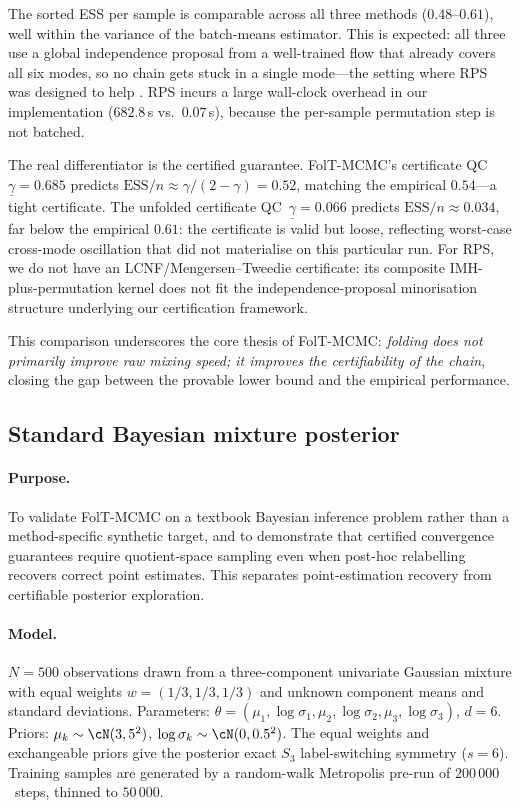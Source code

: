 The sorted ESS per sample is comparable across all three methods
($0.48$--$0.61$), well within the variance of the batch-means
estimator.  This is expected: all three use a global independence
proposal from a well-trained flow that already covers all six
modes, so no chain gets stuck in a single mode---the setting where
RPS was designed to help \citep{FruhwirthSchnatter2001}.
RPS incurs a large wall-clock overhead in our implementation
($682.8$\,s vs.\ $0.07$\,s), because the per-sample permutation
step is not batched.

The real differentiator is the certified guarantee.
FolT-MCMC's certificate QC~$\underline{\gamma} = 0.685$ predicts
$\mathrm{ESS}/n \approx \gamma/(2-\gamma) = 0.52$, matching the
empirical $0.54$---a tight certificate.
The unfolded certificate QC~$\underline{\gamma} = 0.066$ predicts
$\mathrm{ESS}/n \approx 0.034$, far below the empirical $0.61$:
the certificate is valid but loose, reflecting worst-case
cross-mode oscillation that did not materialise on this particular
run.
For RPS, we do not have an LCNF/Mengersen--Tweedie certificate:
its composite IMH-plus-permutation kernel does not fit the
independence-proposal minorisation structure underlying our
certification framework.

This comparison underscores the core thesis of FolT-MCMC:
\emph{folding does not primarily improve raw mixing speed; it
improves the certifiability of the chain}, closing the gap between
the provable lower bound and the empirical performance.


\subsection{Standard Bayesian mixture posterior}
\label{sec:exp_bayesian_mixture}

\paragraph{Purpose.}
To validate FolT-MCMC on a textbook Bayesian inference problem
rather than a method-specific synthetic target, and to demonstrate
that certified convergence guarantees require quotient-space
sampling even when post-hoc relabelling recovers correct point
estimates.  This separates point-estimation recovery from
certifiable posterior exploration.

\paragraph{Model.}
$N = 500$ observations drawn from a three-component univariate
Gaussian mixture with equal weights $w = (1/3, 1/3, 1/3)$ and
unknown component means and standard deviations.
Parameters: $\theta = (\mu_1, \log\sigma_1, \mu_2, \log\sigma_2,
\mu_3, \log\sigma_3)$, $d = 6$.
Priors: $\mu_k \sim \cN(3, 5^2)$,
$\log\sigma_k \sim \cN(0, 0.5^2)$.
The equal weights and exchangeable priors give the posterior
exact $S_3$ label-switching symmetry ($s = 6$).
Training samples are generated by a random-walk Metropolis
pre-run of $200\,000$~steps, thinned to $50\,000$.

